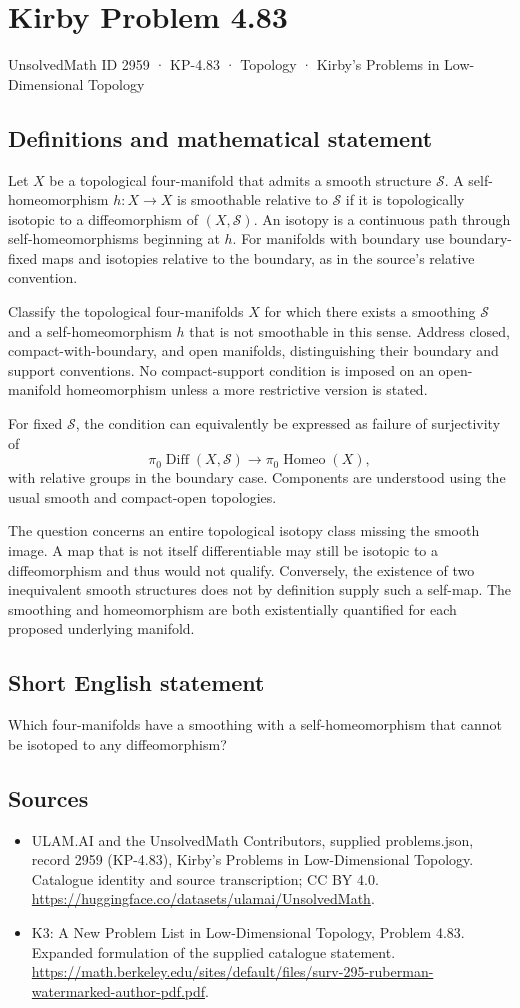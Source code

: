 \documentclass[11pt,a4paper]{article}
\begin{document}
\section*{Kirby Problem 4.83}\label{2959}
{\small UnsolvedMath ID 2959 · KP-4.83 · Topology · Kirby's Problems in Low-Dimensional Topology}
\subsection{Definitions and mathematical statement}
Let $X$ be a topological four-manifold that admits a smooth structure $\mathcal S$. A self-homeomorphism $h:X\to X$ is smoothable relative to $\mathcal S$ if it is topologically isotopic to a diffeomorphism of $(X,\mathcal S)$. An isotopy is a continuous path through self-homeomorphisms beginning at $h$. For manifolds with boundary use boundary-fixed maps and isotopies relative to the boundary, as in the source's relative convention.

Classify the topological four-manifolds $X$ for which there exists a smoothing $\mathcal S$ and a self-homeomorphism $h$ that is not smoothable in this sense. Address closed, compact-with-boundary, and open manifolds, distinguishing their boundary and support conventions. No compact-support condition is imposed on an open-manifold homeomorphism unless a more restrictive version is stated.

For fixed $\mathcal S$, the condition can equivalently be expressed as failure of surjectivity of
\[
\pi_0\operatorname{Diff}(X,\mathcal S)
\longrightarrow\pi_0\operatorname{Homeo}(X),
\]
with relative groups in the boundary case. Components are understood using the usual smooth and compact-open topologies.

The question concerns an entire topological isotopy class missing the smooth image. A map that is not itself differentiable may still be isotopic to a diffeomorphism and thus would not qualify. Conversely, the existence of two inequivalent smooth structures does not by definition supply such a self-map. The smoothing and homeomorphism are both existentially quantified for each proposed underlying manifold.
\subsection{Short English statement}
Which four-manifolds have a smoothing with a self-homeomorphism that cannot be isotoped to any diffeomorphism?
\subsection{Sources}
\begin{itemize}
\item[S1] ULAM.AI and the UnsolvedMath Contributors, supplied problems.json, record 2959 (KP-4.83), Kirby's Problems in Low-Dimensional Topology. Catalogue identity and source transcription; CC BY 4.0.
\url{https://huggingface.co/datasets/ulamai/UnsolvedMath}.
\item[S2] K3: A New Problem List in Low-Dimensional Topology, Problem 4.83. Expanded formulation of the supplied catalogue statement.
\url{https://math.berkeley.edu/sites/default/files/surv-295-ruberman-watermarked-author-pdf.pdf}.
\end{itemize}
\end{document}
